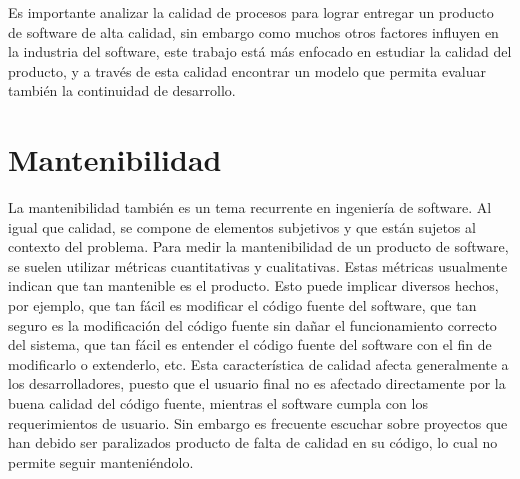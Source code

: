 Es importante analizar la calidad de procesos para lograr entregar un producto
de software de alta calidad, sin embargo como muchos otros factores influyen
en la industria del software, este trabajo está más enfocado en estudiar
la calidad del producto, y a través de esta calidad encontrar un modelo que
permita evaluar también la continuidad de desarrollo.

\section{Mantenibilidad}

La mantenibilidad también es un tema recurrente en ingeniería de software.
Al igual que calidad, se compone de elementos subjetivos y que están sujetos
al contexto del problema. Para medir la mantenibilidad de un producto de
software, se suelen utilizar métricas cuantitativas y cualitativas. Estas
métricas usualmente indican que tan mantenible es el producto.
Esto puede implicar diversos hechos, por ejemplo, que tan fácil es modificar
el código fuente del software, que tan seguro es la modificación del código
fuente sin dañar el funcionamiento correcto del sistema, que tan fácil es entender el código
fuente del software con el fin de modificarlo o extenderlo, etc.
Esta característica de calidad afecta generalmente a los desarrolladores,
puesto que el usuario final no es afectado directamente por la buena calidad
del código fuente, mientras el software cumpla con los requerimientos de usuario.
Sin embargo es frecuente escuchar sobre proyectos que han debido ser paralizados
producto de falta de calidad en su código, lo cual no permite seguir
manteniéndolo.

